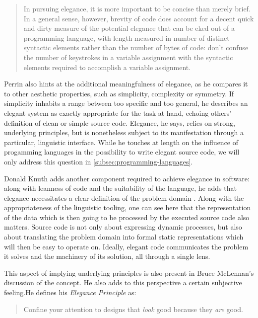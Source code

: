 \begin{quote}
  In pursuing elegance, it is more important to be concise than merely brief. In a general sense, however, brevity of code does account for a decent quick and dirty measure of the potential elegance that can be eked out of a programming language, with length measured in number of distinct syntactic elements rather than the number of bytes of code: don't confuse the number of keystrokes in a variable assignment with the syntactic elements required to accomplish a variable assignment. \citep{perrin_itlog_2006}
\end{quote}

Perrin also hints at the additional meaningfulness of elegance, as he compares it to other aesthetic properties, such as simplicity, complexity or symmetry. If simplicity inhabits a range between too specific and too general, he describes an elegant system as exactly appropriate for the task at hand, echoing others' definition of clean or simple source code. Elegance, he says, relies on strong, underlying principles, but is nonetheless subject to its manifestation through a particular, linguistic interface. While he touches at length on the influence of progamming languages in the possibility to write elegant source code, we will only address this question in \ref{subsec:programming-languages}.

Donald Knuth adds another component required to achieve elegance in software: along with leanness of code and the suitability of the language, he adds that elegance necessitates a clear definition of the problem domain \citep{fuller_software_2008}. Along with the appropriateness of the linguistic tooling, one can see here that the representation of the data which is then going to be processed by the executed source code also matters. Source code is not only about expressing dynamic processes, but also about translating the problem domain into formal static representations which will then be easy to operate on. Ideally, elegant code communicates the problem it solves and the machinery of its solution, all through a single lens.

This aspect of implying underlying principles is also present in Bruce McLennan's discussion of the concept. He also adds to this perspective a certain subjective feeling.He defines his \emph{Elegance Principle} as:

\begin{quote}
  Confine your attention to designs that \emph{look} good because they \emph{are} good. \citep{mclennan_who_1997}
\end{quote}

